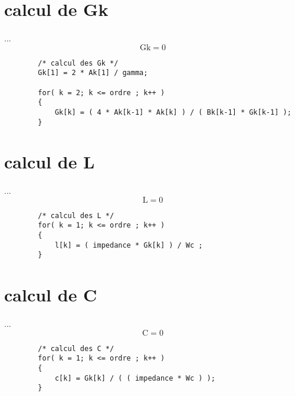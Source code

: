 \documentclass[a4paper,11pt]{article}
\begin{document}
\section{calcul de Gk }
    \paragraph{}
    ... \[ \mbox{Gk} = 0 \]
    \begin{lstlisting}
        /* calcul des Gk */
        Gk[1] = 2 * Ak[1] / gamma;

        for( k = 2; k <= ordre ; k++ )
        {
            Gk[k] = ( 4 * Ak[k-1] * Ak[k] ) / ( Bk[k-1] * Gk[k-1] );
        }
    \end{lstlisting}

\section{calcul de L }
    \paragraph{}
    ... \[ \mbox{L} = 0 \]
    \begin{lstlisting}
        /* calcul des L */
        for( k = 1; k <= ordre ; k++ )
        {
            l[k] = ( impedance * Gk[k] ) / Wc ;
        }
    \end{lstlisting}

\section{calcul de C }
    \paragraph{}
    ... \[ \mbox{C} = 0 \]
    \begin{lstlisting}
        /* calcul des C */
        for( k = 1; k <= ordre ; k++ )
        {
            c[k] = Gk[k] / ( ( impedance * Wc ) );
        }
    \end{lstlisting}
\end{document}
